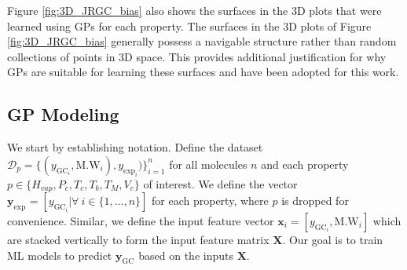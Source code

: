 \documentclass[journal=jacsat,manuscript=article, ]{achemso}
\newcommand{\xvec}{\ensuremath{\mathbf{x}}}
\newcommand{\Ygc}[1][]{\ensuremath{y_{\text{GC}_{#1}}}}
\newcommand{\Ygcvec}[1][]{\ensuremath{\mathbf{y}_{\text{GC}_{#1}}}}
\newcommand{\yexpvec}[1][]{\ensuremath{\mathbf{y}_{\text{exp}_{#1}}}}
\newcommand{\yexp}[1][]{\ensuremath{y_{\text{exp}_{#1}}}}
\begin{document}
Figure \ref{fig:3D_JRGC_bias} also shows the surfaces in the 3D plots that were learned using GPs for each property. 
The surfaces in the 3D plots of Figure \ref{fig:3D_JRGC_bias} generally possess a navigable structure rather than random collections of points in 3D space. This provides additional justification for why GPs are suitable for learning these surfaces and have been adopted for this work.

\subsection{GP Modeling}

We start by establishing notation. Define the dataset $\mathcal{D}_p = \{(\Ygc[i], \text{M.W}_i), \yexp[i])\}_{i=1}^n$ for all molecules $n$ and each property $p \in \{H_{vap}, P_c, T_c, T_b ,T_M, V_c\}$ of interest. We define the vector $\yexpvec = [\Ygc[i] | \forall ~ i \in \{1,...,n\}]$ for each property, where $p$ is dropped for convenience. Similar, we define the input feature vector $\xvec_i = [\Ygc[i], \text{M.W}_i]$ which are stacked vertically to form the input feature matrix $\mathbf{X}$. Our goal is to train ML models to predict $\Ygcvec$ based on the inputs $\mathbf{X}$.

\end{document}

